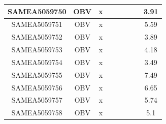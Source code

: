 \documentclass[../main.tex]{subfiles}
\begin{document}
\begin{flushleft}
\begin{footnotesize}
\begin{longtable}{|c|c|c|c|c|c|c|}
    \hline
    SAMEA5059750  & OBV   & x                                                            & ~          & ~                                                                           & ~                                                                 & 3.91      \\ 
    \hline
    SAMEA5059751  & OBV   & x                                                            & ~          & ~                                                                           & ~                                                                 & 5.59      \\ 
    \hline
    SAMEA5059752  & OBV   & x                                                            & ~          & ~                                                                           & ~                                                                 & 3.89      \\ 
    \hline
    SAMEA5059753  & OBV   & x                                                            & ~          & ~                                                                           & ~                                                                 & 4.18      \\ 
    \hline
    SAMEA5059754  & OBV   & x                                                            & ~          & ~                                                                           & ~                                                                 & 3.49      \\ 
    \hline
    SAMEA5059755  & OBV   & x                                                            & ~          & ~                                                                           & ~                                                                 & 7.49      \\ 
    \hline
    SAMEA5059756  & OBV   & x                                                            & ~          & ~                                                                           & ~                                                                 & 6.65      \\ 
    \hline
    SAMEA5059757  & OBV   & x                                                            & ~          & ~                                                                           & ~                                                                 & 5.74      \\ 
    \hline
    SAMEA5059758  & OBV   & x                                                            & ~          & ~                                                                           & ~                                                                 & 5.1       \\ 

\end{longtable}
\end{footnotesize}
\end{flushleft}
\end{document}

